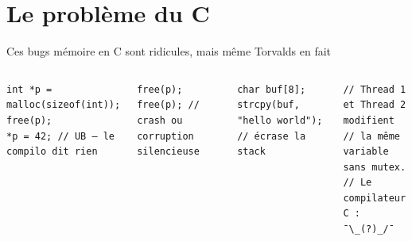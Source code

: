 \documentclass[aspectratio=169, 10pt]{beamer}
\begin{document}
\section{Le problème du C}

\begin{frame}[fragile]{Ces bugs mémoire en C sont ridicules, mais même Torvalds en fait}
  \begin{columns}[t]
    \begin{tcolorbox}[dangerbox, title={\faSkull\ Use-after-free}]
      \begin{verbatim}
int *p = malloc(sizeof(int));
free(p);
*p = 42; // UB — le compilo dit rien
      \end{verbatim}
    \end{tcolorbox}
    \vspace{0.3em}
    \begin{tcolorbox}[dangerbox, title={\faSkull\ Double free}]
      \begin{verbatim}
free(p);
free(p); // crash ou corruption silencieuse
      \end{verbatim}
    \end{tcolorbox}
    \begin{tcolorbox}[dangerbox, title={\faSkull\ Buffer overflow}]
      \begin{verbatim}
char buf[8];
strcpy(buf, "hello world"); // écrase la stack
      \end{verbatim}
    \end{tcolorbox}
    \vspace{0.3em}
    \begin{tcolorbox}[dangerbox, title={\faSkull\ Data race (multi-thread)}]
      \begin{verbatim}
// Thread 1 et Thread 2 modifient
// la même variable sans mutex.
// Le compilateur C : ¯\_(?)_/¯
      \end{verbatim}
    \end{tcolorbox}
  \end{columns}
\end{frame}
\end{document}
